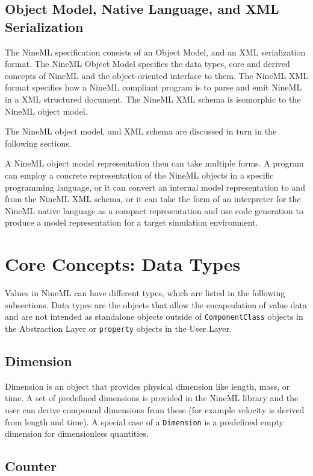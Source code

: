 \documentclass{article}
\begin{document}
\subsection{Object Model, Native Language, and XML Serialization}

The NineML specification consists of an Object Model, and an XML serialization
format. The NineML Object Model specifies the data types, core and derived
concepts of NineML and the object-oriented interface to them. The NineML
XML format specifies how a NineML compliant program is to parse and emit
NineML in a XML structured document.  The NineML XML schema is
isomorphic to the NineML object model.

The NineML object model, and XML schema are discussed in turn in the
following sections.

A NineML object model representation then can take multiple forms.  A
program can employ a concrete representation of the NineML objects in
a specific programming language, or it can convert an internal model
representation to and from the NineML XML schema, or it can take the
form of an interpreter for the NineML native language as a compact
representation and use code generation to produce a model
representation for a target simulation environment.

\section{Core Concepts: Data Types}
\label{DataTypes}

Values in NineML can have different types, which are listed in the
following subsections. Data types are the objects that allow the
encapsulation of value data and are not intended as standalone
objects outside of {\tt ComponentClass} objects in the Abstraction
Layer or {\tt property} objects in the User Layer.

\subsection{Dimension}

Dimension is an object that provides physical dimension like length,
mass, or time. A set of predefined dimensions is provided in the
NineML library and the user can derive compound dimensions from these
(for example velocity is derived from length and time). A special case
of a {\tt Dimension} is a predefined empty dimension for dimensionless
quantities.

\subsection{Counter}
\end{document}
